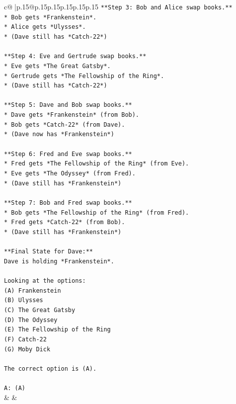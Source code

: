 \documentclass{article}
\begin{document}
{\begin{supertabular}{c@{$\;$}|p{.15\linewidth}@{}p{.15\linewidth}p{.15\linewidth}p{.15\linewidth}p{.15\linewidth}p{.15\linewidth}}
{{{\texttt{**Step 3: Bob and Alice swap books.**} \\
\texttt{*   Bob gets *Frankenstein*.} \\
\texttt{*   Alice gets *Ulysses*.} \\
\texttt{*   (Dave still has *Catch{-}22*)} \\
\\ 
\texttt{**Step 4: Eve and Gertrude swap books.**} \\
\texttt{*   Eve gets *The Great Gatsby*.} \\
\texttt{*   Gertrude gets *The Fellowship of the Ring*.} \\
\texttt{*   (Dave still has *Catch{-}22*)} \\
\\ 
\texttt{**Step 5: Dave and Bob swap books.**} \\
\texttt{*   Dave gets *Frankenstein* (from Bob).} \\
\texttt{*   Bob gets *Catch{-}22* (from Dave).} \\
\texttt{*   (Dave now has *Frankenstein*)} \\
\\ 
\texttt{**Step 6: Fred and Eve swap books.**} \\
\texttt{*   Fred gets *The Fellowship of the Ring* (from Eve).} \\
\texttt{*   Eve gets *The Odyssey* (from Fred).} \\
\texttt{*   (Dave still has *Frankenstein*)} \\
\\ 
\texttt{**Step 7: Bob and Fred swap books.**} \\
\texttt{*   Bob gets *The Fellowship of the Ring* (from Fred).} \\
\texttt{*   Fred gets *Catch{-}22* (from Bob).} \\
\texttt{*   (Dave still has *Frankenstein*)} \\
\\ 
\texttt{**Final State for Dave:**} \\
\texttt{Dave is holding *Frankenstein*.} \\
\\ 
\texttt{Looking at the options:} \\
\texttt{(A) Frankenstein} \\
\texttt{(B) Ulysses} \\
\texttt{(C) The Great Gatsby} \\
\texttt{(D) The Odyssey} \\
\texttt{(E) The Fellowship of the Ring} \\
\texttt{(F) Catch{-}22} \\
\texttt{(G) Moby Dick} \\
\\ 
\texttt{The correct option is (A).} \\
\\ 
\texttt{A: (A)} \\
            }
        }
    }
    & & \\ \\


\end{supertabular}}
\end{document}
